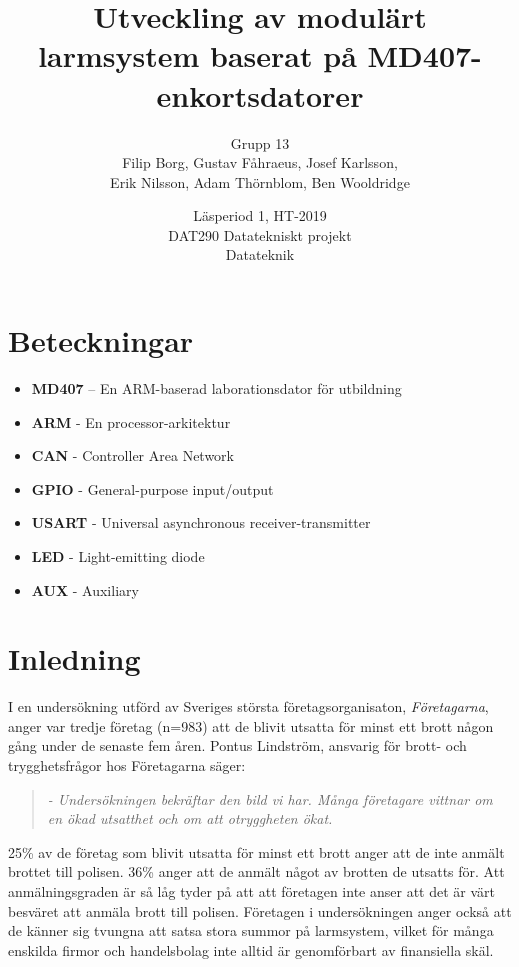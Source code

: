 \documentclass{article}
\title{Utveckling av modulärt larmsystem baserat på MD407-enkortsdatorer}
\author{\large Grupp 13\\Filip Borg, Gustav Fåhraeus, Josef Karlsson,\\
Erik Nilsson, Adam Thörnblom, Ben Wooldridge}
\date{Läsperiod 1, HT-2019\\DAT290 Datatekniskt projekt\\Datateknik}
\begin{document}
\maketitle
{}
\newpage

\tableofcontents
\newpage


\section*{Beteckningar}
\begin{itemize}
    \item \textbf{MD407} – En ARM-baserad
    laborationsdator för utbildning
    \item \textbf{ARM} - En processor-arkitektur
    \item \textbf{CAN} - Controller Area Network
    \item \textbf{GPIO} - General-purpose input/output
    \item \textbf{USART} - Universal asynchronous receiver-transmitter
    \item \textbf{LED} - Light-emitting diode
    \item \textbf{AUX} - Auxiliary
\end{itemize}
\newpage

\section{Inledning}
I en undersökning\cite{brott-foretagarna} utförd av Sveriges största företagsorganisaton, \textit{Företagarna}, anger var tredje företag (n=983) att de blivit utsatta för minst ett brott någon gång under de senaste fem åren. Pontus Lindström, ansvarig för brott- och trygghetsfrågor hos Företagarna säger:
\begin{quote}
\textit{- Undersökningen bekräftar den bild vi har. Många företagare vittnar om en ökad utsatthet och om att otryggheten ökat.}
\end{quote}

25\% av de företag som blivit utsatta för minst ett brott anger att de inte anmält brottet till polisen. 36\% anger att de anmält något av brotten de utsatts för. Att anmälningsgraden är så låg tyder på att att företagen inte anser att det är värt besväret att anmäla brott till polisen. Företagen i undersökningen anger också att de känner sig tvungna att satsa stora summor på larmsystem, vilket för många enskilda firmor och handelsbolag inte alltid är genomförbart av finansiella skäl.
\end{document}
